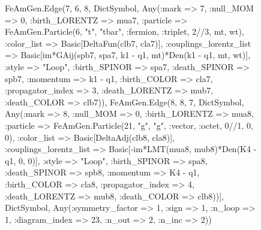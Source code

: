 \documentclass{revtex4}
\begin{document}
\begin{figure}[!htb]
\begin{center}
{FeAmGen.Edge(7, 6, 8, Dict{Symbol, Any}(:mark => 7, :null_MOM => 0, :birth_LORENTZ => mua7, :particle => FeAmGen.Particle(6, "t", "tbar", :fermion, :triplet, 2//3, mt, wt), :color_list => Basic[DeltaFun(clb7, cla7)], :couplings_lorentz_list => Basic[im*GAij(spb7, spa7, k1 - q1, mt)*Den(k1 - q1, mt, wt)], :style => "Loop", :birth_SPINOR => spa7, :death_SPINOR => spb7, :momentum => k1 - q1, :birth_COLOR => cla7, :propagator_index => 3, :death_LORENTZ => mub7, :death_COLOR => clb7)), FeAmGen.Edge(8, 8, 7, Dict{Symbol, Any}(:mark => 8, :null_MOM => 0, :birth_LORENTZ => mua8, :particle => FeAmGen.Particle(21, "g", "g", :vector, :octet, 0//1, 0, 0), :color_list => Basic[DeltaAdj(clb8, cla8)], :couplings_lorentz_list => Basic[-im*LMT(mua8, mub8)*Den(K4 - q1, 0, 0)], :style => "Loop", :birth_SPINOR => spa8, :death_SPINOR => spb8, :momentum => K4 - q1, :birth_COLOR => cla8, :propagator_index => 4, :death_LORENTZ => mub8, :death_COLOR => clb8))], Dict{Symbol, Any}(:symmetry_factor => 1, :sign => 1, :n_loop => 1, :diagram_index => 23, :n_out => 2, :n_inc => 2)) 
}
\end{center}
\end{figure}
\end{document}
